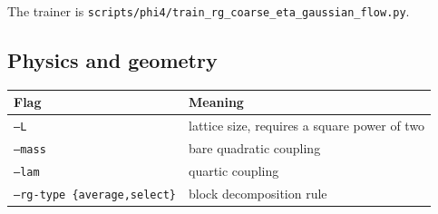 \documentclass[11pt]{article}
\begin{document}
The trainer is
\texttt{scripts/phi4/train\_rg\_coarse\_eta\_gaussian\_flow.py}.

\subsection*{Physics and geometry}
\begin{longtable}{@{}ll@{}}
\toprule
Flag & Meaning \\
\midrule
\texttt{--L} & lattice size, requires a square power of two \\
\texttt{--mass} & bare quadratic coupling \\
\texttt{--lam} & quartic coupling \\
\texttt{--rg-type \{average,select\}} & block decomposition rule \\
\bottomrule
\end{longtable}
\end{document}
